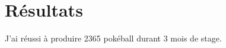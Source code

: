 \documentclass[../main.tex]{subfiles}
\begin{document}
\section{Résultats}

J'ai réussi à produire 2365 pokéball durant 3 mois de stage.
\end{document}

